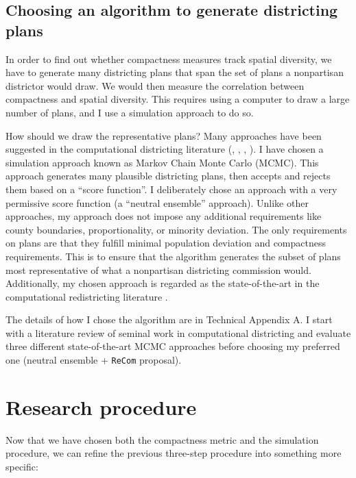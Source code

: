 \documentclass[]{article}
\begin{document}
\hypertarget{choosing-an-algorithm-to-generate-districting-plans}{%
\subsection{Choosing an algorithm to generate districting
plans}\label{choosing-an-algorithm-to-generate-districting-plans}}

In order to find out whether compactness measures track spatial
diversity, we have to generate many districting plans that span the set
of plans a nonpartisan districtor would draw. We would then measure the
correlation between compactness and spatial diversity. This requires
using a computer to draw a large number of plans, and I use a simulation
approach to do so.

How should we draw the representative plans? Many approaches have been
suggested in the computational districting literature (\cite{ccd2000},
\cite{cr2013}, \cite{fifieldwp}, \cite{ddj2019recom}). I have chosen a
simulation approach known as Markov Chain Monte Carlo (MCMC). This
approach generates many plausible districting plans, then accepts and
rejects them based on a ``score function''. I deliberately chose an
approach with a very permissive score function (a ``neutral ensemble''
approach). Unlike other approaches, my approach does not impose any
additional requirements like county boundaries, proportionality, or
minority deviation. The only requirements on plans are that they fulfill
minimal population deviation and compactness requirements. This is to
ensure that the algorithm generates the subset of plans most
representative of what a nonpartisan districting commission would.
Additionally, my chosen approach is regarded as the state-of-the-art in
the computational redistricting literature \citep{ddj2019recom}.

The details of how I chose the algorithm are in Technical Appendix A. I
start with a literature review of seminal work in computational
districting and evaluate three different state-of-the-art MCMC
approaches before choosing my preferred one (neutral ensemble +
\texttt{ReCom} proposal).

\hypertarget{research-procedure}{%
\section{Research procedure}\label{research-procedure}}

Now that we have chosen both the compactness metric and the simulation
procedure, we can refine the previous three-step procedure into
something more specific:
\end{document}
